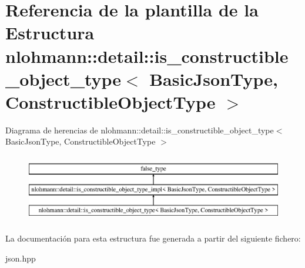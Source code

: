 \hypertarget{structnlohmann_1_1detail_1_1is__constructible__object__type}{}\section{Referencia de la plantilla de la Estructura nlohmann\+:\+:detail\+:\+:is\+\_\+constructible\+\_\+object\+\_\+type$<$ Basic\+Json\+Type, Constructible\+Object\+Type $>$}
\label{structnlohmann_1_1detail_1_1is__constructible__object__type}
Diagrama de herencias de nlohmann\+:\+:detail\+:\+:is\+\_\+constructible\+\_\+object\+\_\+type$<$ Basic\+Json\+Type, Constructible\+Object\+Type $>$\begin{figure}[H]
\begin{center}
\leavevmode
\includegraphics[height=2.984014cm]{structnlohmann_1_1detail_1_1is__constructible__object__type}
\end{center}
\end{figure}


La documentación para esta estructura fue generada a partir del siguiente fichero\+:\begin{DoxyCompactItemize}
\item 
json.\+hpp\end{DoxyCompactItemize}
